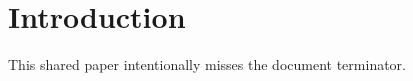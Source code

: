 \documentclass{article}
\begin{document}
\section{Introduction}
This shared paper intentionally misses the document terminator.
\end{document}
